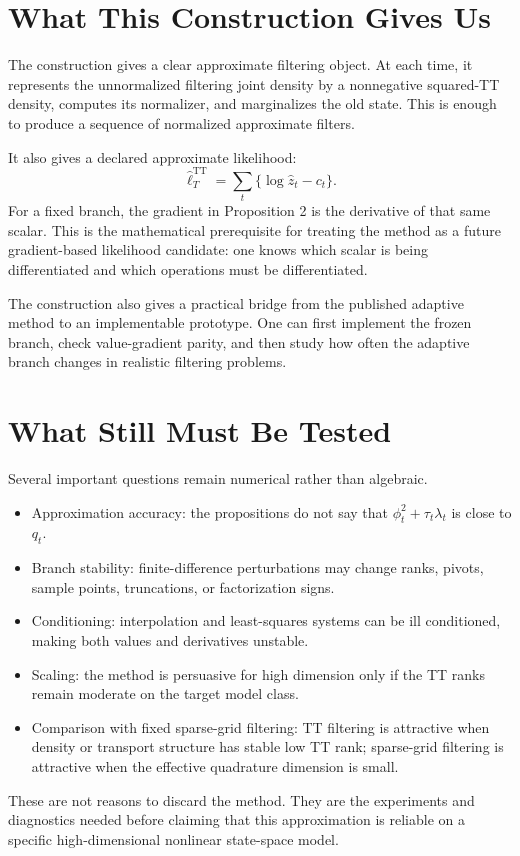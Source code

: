 \documentclass[11pt]{article}
\newcommand{\TT}{\mathrm{TT}}
\theoremstyle{definition}
\theoremstyle{remark}
\begin{document}
\section{What This Construction Gives Us}

The construction gives a clear approximate filtering object.  At each time,
it represents the unnormalized filtering joint density by a nonnegative
squared-TT density, computes its normalizer, and marginalizes the old state.
This is enough to produce a sequence of normalized approximate filters.

It also gives a declared approximate likelihood:
\[
  \widehat\ell_T^{\TT}
  =
  \sum_t\{\log\widehat z_t-c_t\}.
\]
For a fixed branch, the gradient in Proposition 2 is the derivative of that
same scalar.  This is the mathematical prerequisite for treating the method as
a future gradient-based likelihood candidate: one knows which scalar is being
differentiated and which operations must be differentiated.

The construction also gives a practical bridge from the published adaptive
method to an implementable prototype.  One can first implement the frozen
branch, check value-gradient parity, and then study how often the adaptive
branch changes in realistic filtering problems.

\section{What Still Must Be Tested}

Several important questions remain numerical rather than algebraic.

\begin{itemize}[leftmargin=*]
\item Approximation accuracy: the propositions do not say that
  \(\phi_t^2+\tau_t\lambda_t\) is close to \(q_t\).
\item Branch stability: finite-difference perturbations may change ranks,
  pivots, sample points, truncations, or factorization signs.
\item Conditioning: interpolation and least-squares systems can be ill
  conditioned, making both values and derivatives unstable.
\item Scaling: the method is persuasive for high dimension only if the TT ranks
  remain moderate on the target model class.
\item Comparison with fixed sparse-grid filtering: TT filtering is attractive
  when density or transport structure has stable low TT rank; sparse-grid
  filtering is attractive when the effective quadrature dimension is small.
\end{itemize}
These are not reasons to discard the method.  They are the experiments and
diagnostics needed before claiming that this approximation is reliable on a
specific high-dimensional nonlinear state-space model.
\end{document}
